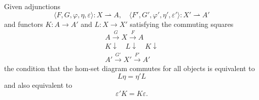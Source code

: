 Given adjunctions
$$\langle F, G, \varphi, \eta, \varepsilon \rangle : X \rightharpoonup A, \quad \langle F', G', \varphi', \eta', \varepsilon' \rangle : X' \rightharpoonup A'$$
and functors $K : A \to A'$ and $L : X \to X'$ satisfying the commuting squares
$$\begin{array}{c}
A \xrightarrow{G} X \xrightarrow{F} A \\
K \downarrow \quad L \downarrow \quad K \downarrow \\
A' \xrightarrow{G'} X' \xrightarrow{F'} A'
\end{array}$$
the condition that the hom-set diagram commutes for all objects is equivalent to
$$L\eta = \eta' L$$
and also equivalent to
$$\varepsilon' K = K \varepsilon.$$
